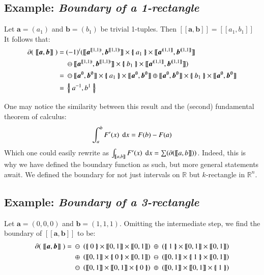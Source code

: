 \subsection{Example: \emph{Boundary of a 1-rectangle}}
Let $\boldsymbol{a}= (a_1)$ and $\boldsymbol{b} = (b_1)$ be trivial 1-tuples. 
Then $[\![\boldsymbol{a}, \boldsymbol{b}]\!] = [\![a_1, b_1]\!]$
It follows that:
\begin{align*}
	\partial ( \; [\![ \boldsymbol{a}, \boldsymbol{b} ]\!] \; )
	=& \; (-1)^i ( [\![\boldsymbol{a}^{[\![1,1)\!)}, \boldsymbol{b}^{[\![1,1)\!)} ]\!]
	\times \hset{a_1} \times
	[\![\boldsymbol{a}^{(\!(1,1]\!]}, \boldsymbol{b}^{(\!(1,1]\!]} ]\!]\\
	&\; \ominus
	[\![\boldsymbol{a}^{[\![1,1)\!)}, \boldsymbol{b}^{[\![1,1)\!)} ]\!]
	\times \hset{b_1} \times
	[\![\boldsymbol{a}^{(\!(1,1]\!]}, \boldsymbol{b}^{(\!(1,1]\!]} ]\!] )\\
	=& \; \ominus [\![\boldsymbol{a}^{\emptyset}, \boldsymbol{b}^{\emptyset} ]\!]
	\times \hset{a_1} \times
	[\![\boldsymbol{a}^{\emptyset}, \boldsymbol{b}^{\emptyset} ]\!]
	\oplus
	[\![\boldsymbol{a}^{\emptyset}, \boldsymbol{b}^{\emptyset} ]\!]
	\times \hset{b_1} \times
	[\![\boldsymbol{a}^{\emptyset}, \boldsymbol{b}^{\emptyset} ]\!] \\
	=& \; \hset{a^{-1}, b^{1}}
\end{align*}

One may notice the similarity between this result and the (second) fundamental theorem of calculus:
\begin{equation*}
	\int_a^b F'(x) \; \mathop{}\!\mathrm{d} x = F(b) - F(a)
\end{equation*}
Which one could easily rewrite as $\int_{[\![a,b]\!]} F'(x) \; \mathop{}\!\mathrm{d} x = \sum (\partial([\![a,b]\!]))$.
Indeed, this is why we have defined the boundary function as such, but more general statements await.
We defined the boundary for not just intervals on $\mathbb{R}$ but $k$-rectangle in $\mathbb{R}^n$.




\subsection{Example: \emph{Boundary of a 3-rectangle}}
Let $\boldsymbol{a} = (0,0,0)$ and $\boldsymbol{b} = (1,1,1)$.
Omitting the intermediate step, we find the boundary of $[\![ \boldsymbol{a}, \boldsymbol{b} ]\!]$ to be:
\begin{align*}
	\partial ( \; [\![ \boldsymbol{a} , \boldsymbol{b} ]\!] \; ) =
	& 	\; \ominus \; \left( \hset{0} \times [\![0,1]\!] \times [\![0,1]\!] \right)
		\; \oplus \; \left( \hset{1} \times [\![0,1]\!] \times [\![0,1]\!] \right)
	\\& 	\; \oplus \; \left( [\![0,1]\!] \times \hset{0} \times [\![0,1]\!] \right)
	 	\; \ominus \; \left( [\![0,1]\!] \times \hset{1} \times [\![0,1]\!] \right)
	\\& 	\; \ominus \; \left( [\![0,1]\!] \times [\![0,1]\!] \times \hset{0} \right)
	  	\; \oplus \; \left( [\![0,1]\!] \times [\![0,1]\!] \times \hset{1} \right)
\end{align*}

